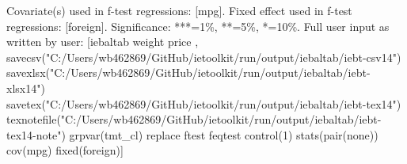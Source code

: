 Covariate(s) used in f-test regressions: [mpg]. Fixed effect used in f-test regressions: [foreign]. Significance: ***=1\%, **=5\%, *=10\%. Full user input as written by user: [iebaltab weight price , savecsv("C:/Users/wb462869/GitHub/ietoolkit/run/output/iebaltab/iebt-csv14") savexlsx("C:/Users/wb462869/GitHub/ietoolkit/run/output/iebaltab/iebt-xlsx14") savetex("C:/Users/wb462869/GitHub/ietoolkit/run/output/iebaltab/iebt-tex14") texnotefile("C:/Users/wb462869/GitHub/ietoolkit/run/output/iebaltab/iebt-tex14-note") grpvar(tmt\_cl) replace ftest feqtest control(1) stats(pair(none)) cov(mpg) fixed(foreign)]
